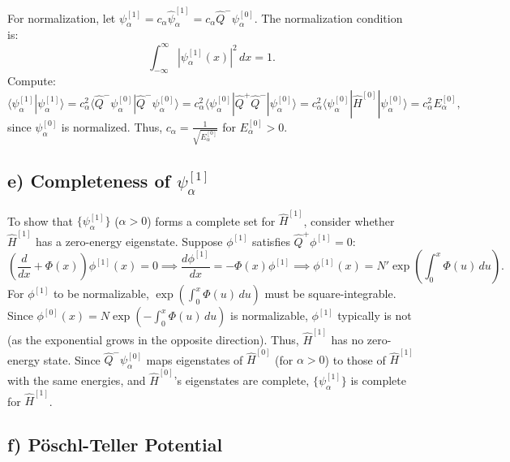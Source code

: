 \documentclass[a4paper,12pt]{article}
\begin{document}
For normalization, let \(\psi_\alpha^{[1]} = c_\alpha \hat{\psi}_\alpha^{[1]} = c_\alpha \hat{Q}^- \psi_\alpha^{[0]}\). The normalization condition is:
\[
\int_{-\infty}^\infty |\psi_\alpha^{[1]}(x)|^2 \, dx = 1.
\]
Compute:
\[
\langle \psi_\alpha^{[1]} | \psi_\alpha^{[1]} \rangle = c_\alpha^2 \langle \hat{Q}^- \psi_\alpha^{[0]} | \hat{Q}^- \psi_\alpha^{[0]} \rangle = c_\alpha^2 \langle \psi_\alpha^{[0]} | \hat{Q}^+ \hat{Q}^- | \psi_\alpha^{[0]} \rangle = c_\alpha^2 \langle \psi_\alpha^{[0]} | \hat{H}^{[0]} | \psi_\alpha^{[0]} \rangle = c_\alpha^2 E_\alpha^{[0]},
\]
since \(\psi_\alpha^{[0]}\) is normalized. Thus, \(c_\alpha = \frac{1}{\sqrt{E_\alpha^{[0]}}}\) for \(E_\alpha^{[0]} > 0\).

\subsection*{e) Completeness of \(\psi_\alpha^{[1]}\)}

To show that \(\{\psi_\alpha^{[1]}\}\) (\(\alpha > 0\)) forms a complete set for \(\hat{H}^{[1]}\), consider whether \(\hat{H}^{[1]}\) has a zero-energy eigenstate. Suppose \(\phi^{[1]}\) satisfies \(\hat{Q}^+ \phi^{[1]} = 0\):
\[
\left( \frac{d}{dx} + \Phi(x) \right) \phi^{[1]}(x) = 0 \implies \frac{d \phi^{[1]}}{dx} = -\Phi(x) \phi^{[1]} \implies \phi^{[1]}(x) = N' \exp \left( \int_0^x \Phi(u) \, du \right).
\]
For \(\phi^{[1]}\) to be normalizable, \(\exp \left( \int_0^x \Phi(u) \, du \right)\) must be square-integrable. Since \(\phi^{[0]}(x) = N \exp \left( -\int_0^x \Phi(u) \, du \right)\) is normalizable, \(\phi^{[1]}\) typically is not (as the exponential grows in the opposite direction). Thus, \(\hat{H}^{[1]}\) has no zero-energy state. Since \(\hat{Q}^- \psi_\alpha^{[0]}\) maps eigenstates of \(\hat{H}^{[0]}\) (for \(\alpha > 0\)) to those of \(\hat{H}^{[1]}\) with the same energies, and \(\hat{H}^{[0]}\)’s eigenstates are complete, \(\{\psi_\alpha^{[1]}\}\) is complete for \(\hat{H}^{[1]}\).

\subsection*{f) Pöschl-Teller Potential}
\end{document}
